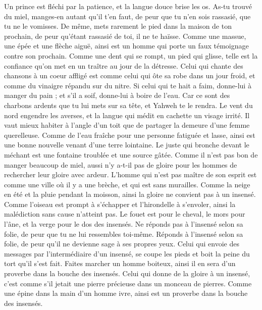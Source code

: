 \begin{multicols}{2}
Un prince est fléchi par la patience, et la langue douce brise les os.
As-tu trouvé du miel, manges-en autant qu'il t'en faut, de peur que tu n'en sois rassasié, que tu ne le vomisses.
De même, mets rarement le pied dans la maison de ton prochain, de peur qu'étant rassasié de toi, il ne te haïsse.
Comme une massue, une épée et une flèche aiguë, ainsi est un homme qui porte un faux témoignage contre son prochain.
Comme une dent qui se rompt, un pied qui glisse, telle est la confiance qu'on met en un traître au jour de la détresse.
Celui qui chante des chansons à un coeur affligé est comme celui qui ôte sa robe dans un jour froid, et comme du vinaigre répandu sur du nitre.
Si celui qui te hait a faim, donne-lui à manger du pain ; et s'il a soif, donne-lui à boire de l'eau.
Car ce sont des charbons ardents que tu lui mets sur sa tête, et Yahweh te le rendra.
Le vent du nord engendre les averses, et la langue qui médit en cachette un visage irrité.
Il vaut mieux habiter à l'angle d'un toit que de partager la demeure d'une femme querelleuse.
Comme de l'eau fraîche pour une personne fatiguée et lasse, ainsi est une bonne nouvelle venant d'une terre lointaine.
Le juste qui bronche devant le méchant est une fontaine troublée et une source gâtée.
Comme il n'est pas bon de manger beaucoup de miel, aussi n'y a-t-il pas de gloire pour les hommes de rechercher leur gloire avec ardeur.
L'homme qui n'est pas maître de son esprit est comme une ville où il y a une brèche, et qui est sans murailles.
\VerseOne{}Comme la neige en été et la pluie pendant la moisson, ainsi la gloire ne convient pas à un insensé.
Comme l'oiseau est prompt à s'échapper et l'hirondelle à s'envoler, ainsi la malédiction sans cause n'atteint pas.
Le fouet est pour le cheval, le mors pour l'âne, et la verge pour le dos des insensés.
Ne réponds pas à l'insensé selon sa folie, de peur que tu ne lui ressembles toi-même.
Réponds à l'insensé selon sa folie, de peur qu'il ne devienne sage à ses propres yeux.
Celui qui envoie des messages par l'intermédiaire d'un insensé, se coupe les pieds et boit la peine du tort qu'il s'est fait.
Faites marcher un homme boiteux, ainsi il en sera d'un proverbe dans la bouche des insensés.
Celui qui donne de la gloire à un insensé, c'est comme s'il jetait une pierre précieuse dans un monceau de pierres.
Comme une épine dans la main d'un homme ivre, ainsi est un proverbe dans la bouche des insensés.

\end{multicols}
